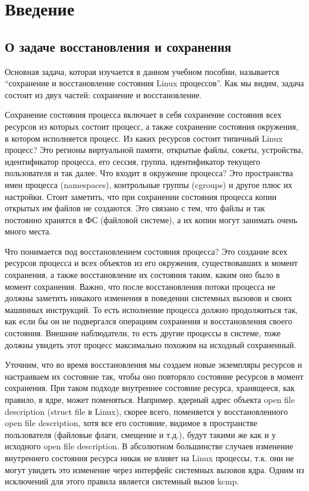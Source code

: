 \chapter{Введение}

\section{О задаче восстановления и сохранения}
 
Основная задача, которая изучается в данном учебном пособии, называется “сохранение и восстановление состояния Linux процессов”. Как мы видим, задача состоит из двух частей: сохранение и восстановление.
 
Сохранение состояния процесса включает в себя сохранение состояния всех ресурсов из которых состоит процесс, а также сохранение состояния окружения, в котором исполняется процесс. Из каких ресурсов состоит типичный Linux процесс? Это регионы виртуальной памяти, открытые файлы, сокеты, устройства, идентификатор процесса, его сессия, группа, идентификатор текущего пользователя и так далее. Что входит в окружение процесса? Это пространства имен процесса (namespaces), контрольные группы (cgroups) и другое плюс их настройки. Стоит заметить, что при сохранении состояния процесса копии открытых им файлов не создаются. Это связано с тем, что файлы и так постоянно хранятся в ФС (файловой системе), а их копии могут занимать очень много места.
 
Что понимается под восстановлением состояния процесса? Это создание всех ресурсов процесса и всех объектов из его окружения, существовавших в момент сохранения, а также восстановление их состояния таким, каким оно было в момент сохранения. Важно, что после восстановления потоки процесса не должны заметить никакого изменения в поведении системных вызовов и своих машинных инструкций. То есть исполнение процесса должно продолжиться так, как если бы он не подвергался операциям сохранения и восстановления своего состояния. Внешние наблюдатели, то есть другие процессы в системе, тоже должны увидеть этот процесс максимально похожим на исходный сохраненный.
 
Уточним, что во время восстановления мы создаем новые экземпляры ресурсов и настраиваем их состояние так, чтобы оно повторяло состояние ресурсов в момент сохранения. При таком подходе внутреннее состояние ресурса, хранящееся, как правило, в ядре, может поменяться. Например, ядерный адрес объекта open file description (struct file в Linux), скорее всего, поменяется у восстановленного open file description, хотя все его состояние, видимое в пространстве пользователя (файловые флаги, смещение и т.д.), будут такими же как и у исходного open file description. В абсолютном большинстве случаев изменение внутреннего состояния ресурса никак не влияет на Linux процессы, т.к. они не могут увидеть это изменение через интерфейс системных вызовов ядра. Одним из исключений для этого правила является системный вызов kcmp.

